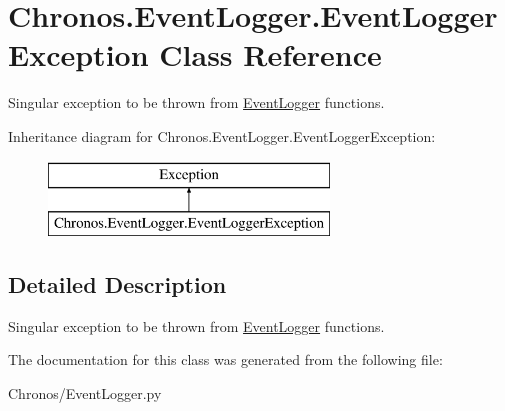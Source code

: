 \hypertarget{classChronos_1_1EventLogger_1_1EventLoggerException}{}\section{Chronos.\+Event\+Logger.\+Event\+Logger\+Exception Class Reference}
\label{classChronos_1_1EventLogger_1_1EventLoggerException}


Singular exception to be thrown from \hyperlink{classChronos_1_1EventLogger_1_1EventLogger}{Event\+Logger} functions.  


Inheritance diagram for Chronos.\+Event\+Logger.\+Event\+Logger\+Exception\+:\begin{figure}[H]
\begin{center}
\leavevmode
\includegraphics[height=2.000000cm]{classChronos_1_1EventLogger_1_1EventLoggerException}
\end{center}
\end{figure}


\subsection{Detailed Description}
Singular exception to be thrown from \hyperlink{classChronos_1_1EventLogger_1_1EventLogger}{Event\+Logger} functions. 

The documentation for this class was generated from the following file\+:\begin{DoxyCompactItemize}
\item 
Chronos/Event\+Logger.\+py\end{DoxyCompactItemize}
